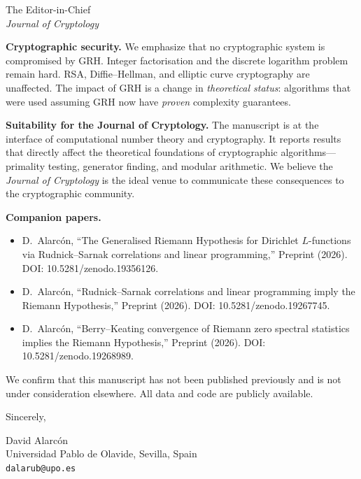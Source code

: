 \documentclass[11pt]{letter}
\begin{document}
\begin{letter}{The Editor-in-Chief \\ \textit{Journal of Cryptology}}
\medskip

\textbf{Cryptographic security.}
We emphasize that no cryptographic system is compromised by GRH.
Integer factorisation and the discrete logarithm problem remain
hard. RSA, Diffie--Hellman, and elliptic curve cryptography are
unaffected. The impact of GRH is a change in \emph{theoretical
status}: algorithms that were used assuming GRH now have
\emph{proven} complexity guarantees.

\medskip

\textbf{Suitability for the Journal of Cryptology.}
The manuscript is at the interface of computational number theory
and cryptography. It reports results that directly affect the
theoretical foundations of cryptographic algorithms---primality
testing, generator finding, and modular arithmetic. We believe the
\textit{Journal of Cryptology} is the ideal venue to communicate
these consequences to the cryptographic community.

\medskip

\textbf{Companion papers.}
\begin{itemize}
\item[{[1]}] D.~Alarc\'on, ``The Generalised Riemann Hypothesis for
Dirichlet $L$-functions via Rudnick--Sarnak correlations and linear
programming,'' Preprint (2026).
DOI: 10.5281/zenodo.19356126.
\item[{[2]}] D.~Alarc\'on, ``Rudnick--Sarnak correlations and linear
programming imply the Riemann Hypothesis,'' Preprint (2026).
DOI: 10.5281/zenodo.19267745.
\item[{[3]}] D.~Alarc\'on, ``Berry--Keating convergence of Riemann
zero spectral statistics implies the Riemann Hypothesis,''
Preprint (2026). DOI: 10.5281/zenodo.19268989.
\end{itemize}

\medskip

We confirm that this manuscript has not been published previously and
is not under consideration elsewhere. All data and code are publicly
available.

\closing{Sincerely,}

David Alarc\'on\\
Universidad Pablo de Olavide, Sevilla, Spain\\
\texttt{dalarub@upo.es}

\end{letter}
\end{document}
